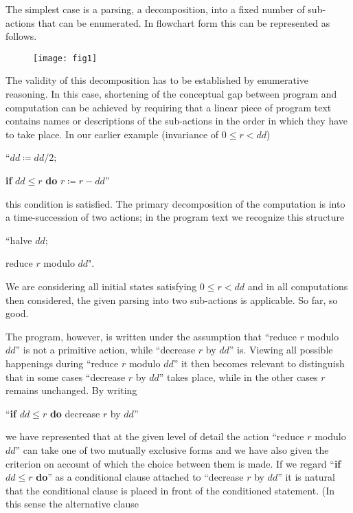 The simplest case is a parsing, a decomposition, into a fixed number of sub-actions that can be enumerated. In flowchart form this can be represented as follows. 

\begin{figure}[h]
	\centering
	\texttt{[image: fig1]}
\end{figure}

The validity of this decomposition has to be established by enumerative reasoning. In this case, shortening of the conceptual gap between program and computation can be achieved by requiring that a linear piece of program text contains names or descriptions of the sub-actions in the order in which they have to take place. In our earlier example (invariance of $0 \leqslant r < dd$)
\medskip

{
	\setlength{\parindent}{8em}
	\hspace{-.5em}``$dd \coloneq dd/2;$
	
	\textbf{if} $dd \leqslant r$ \textbf{do} $r \coloneq r - dd$''
}
\medskip

\noindent
this condition is satisfied. The primary decomposition of the computation is into a time-succession of two actions; in the program text we recognize this structure
\medskip

{
	\setlength{\parindent}{8em}
	\hspace{-.5em}``halve $dd;$
	
	reduce $r$ modulo $dd$".
}
\medskip

We are considering all initial states satisfying $0 \leqslant r < dd$ and in all computations then considered, the given parsing into two sub-actions is applicable. So far, so good.

The program, however, is written under the assumption that ``reduce $r$ modulo $dd$'' is not a primitive action, while ``decrease $r$ by $dd$'' is. Viewing all possible happenings during ``reduce $r$ modulo $dd$'' it then becomes relevant to distinguish that in some cases ``decrease $r$ by $dd$'' takes place, while in the other cases $r$ remains unchanged. By writing
\medskip

{
	\setlength{\parindent}{8em}
	\hspace{-.5em}``\textbf{if} $dd \leqslant r$ \textbf{do} decrease $r$ by $dd$''
}
\medskip

\noindent
we have represented that at the given level of detail the action ``reduce $r$ modulo $dd$'' can take one of two mutually exclusive forms and we have also given the criterion on account of which the choice between them is made. If we regard ``\textbf{if} $dd \leqslant r$ \textbf{do}'' as a conditional clause attached to ``decrease $r$ by $dd$'' it is natural that the conditional clause is placed in front of the conditioned statement. (In this sense the alternative clause
\medskip

